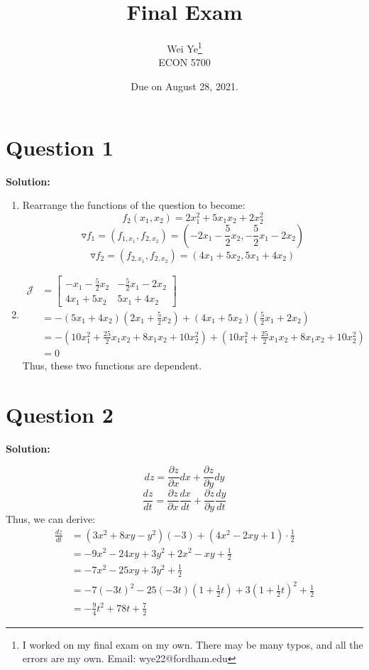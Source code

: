 \documentclass[11pt]{article} %
\title{Final Exam}
\author{Wei Ye\footnote{I worked on my final exam on my own. There may be many typos, and all the errors are my own.  Email: wye22@fordham.edu}  	\\
	ECON 5700}
\date{Due on August 28, 2021.}
\begin{document}
	\maketitle
	\section{Question 1}
	\textbf{Solution:}

\begin{enumerate}
	\item Rearrange the functions of the question to become:
	$$f_2(x_1,x_2)=2x_1^2+5x_1x_2+2x_2^2$$
	$$\triangledown f_1=(f_{1,x_1},f_{2,x_2})=(-2x_1-\frac{5}{2}x_2, -\frac{5}{2}x_1-2x_2)$$
	$$\triangledown f_2=(f_{2,x_1},f_{2,x_2})=(4x_1+5x_2, 5x_1+4x_2)$$
	\item 
	\begin{align*}
	\mathcal{J}&=\begin{bmatrix}
				-x_1-\frac{5}{2}x_2&-\frac{5}{2}x_1-2x_2\\
				4x_1+5x_2&5x_1+4x_2
			\end{bmatrix}\\
		&=-(5x_1+4x_2)(2x_1+\frac{5}{2}x_2)+(4x_1+5x_2)(\frac{5}{2}x_1+2x_2)\\
	&=	-(10x_1^2+\frac{25}{2}x_1x_2+8x_1x_2+10x_2^2)+(10x_1^2+\frac{25}{2}x_1x_2+8x_1x_2+10x_2^2)\\
		&=0
	\end{align*}
Thus, these two functions are dependent. 

\end{enumerate}

\section{Question 2}
\textbf{Solution:}

$$dz=\frac{\partial z}{\partial x}dx+\frac{\partial z}{\partial y}dy$$
$$\frac{dz}{dt}=\frac{\partial z}{\partial x}\frac{dx}{dt}+\frac{\partial z}{\partial y}\frac{dy}{dt}$$
Thus, we can derive:
\begin{align*}
\frac{dz}{dt}&=(3x^2+8xy-y^2)(-3)+(4x^2-2xy+1)\cdot \frac{1}{2}\\
&=-9x^2-24xy+3y^2+2x^2-xy+\frac{1}{2}\\
&=-7x^2-25xy+3y^2+\frac{1}{2}\\
&=-7(-3t)^2-25(-3t)(1+\frac{1}{2}t)+3(1+\frac{1}{2}t)^2+\frac{1}{2}\\
&=-\frac{9}{4}t^2+78t+\frac{7}{2}
\end{align*}
\end{document}

